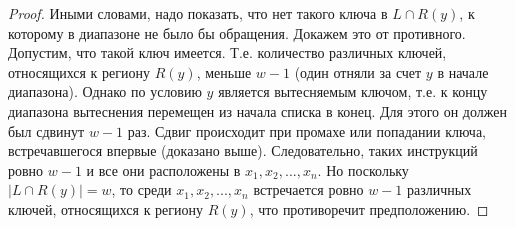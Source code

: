 \begin{proof}
  Иными словами, надо показать, что нет такого ключа в $L \cap R(y)$,
  к которому в диапазоне не было бы обращения. Докажем это от противного.
  Допустим, что такой ключ имеется. Т.е. количество различных ключей,
  относящихся к региону $R(y)$, меньше $w{-}1$ (один отняли за счет $y$ в начале диапазона).
  Однако по условию $y$ является вытесняемым ключом, т.е. к
  концу диапазона вытеснения перемещен из начала списка в конец. Для
  этого он должен был сдвинут $w{-}1$ раз. Сдвиг происходит при
  промахе или попадании ключа, встречавшегося впервые
  (доказано выше). Следовательно, таких инструкций ровно $w-1$ и все они расположены
  в $x_1, x_2, ..., x_n$. Но поскольку $| L \cap R(y) | = w$, то
  среди $x_1, x_2, ..., x_n$ встречается ровно $w-1$ различных
  ключей, относящихся к региону $R(y)$, что противоречит
  предположению.
\end{proof}

